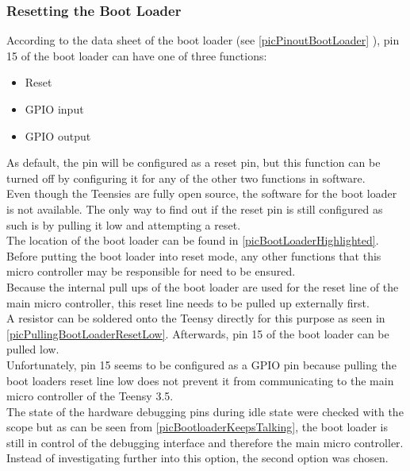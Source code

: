 \subsubsection{Resetting the Boot Loader} \label{txtResettingTheBootLoader}
According to the data sheet of the boot loader (see \autoref{picPinoutBootLoader} ), pin 15 of the boot loader can have one of three functions: \\
\begin{itemize}
    \item Reset
    \item GPIO input
    \item GPIO output
\end{itemize}
As default, the pin will be configured as a reset pin, but this function can be turned off by configuring it for any of the other two functions in software. \\
Even though the Teensies are fully open source, the software for the boot loader is not available. The only way to find out if the reset pin is still configured as such is by pulling it low and attempting a reset. \\
The location of the boot loader can be found in \autoref{picBootLoaderHighlighted}.\\
Before putting the boot loader into reset mode, any other functions that this micro controller may be responsible for need to be ensured. \\
Because the internal pull ups of the boot loader are used for the reset line of the main micro controller, this reset line needs to be pulled up externally first. \\
A resistor can be soldered onto the Teensy directly for this purpose as seen in \autoref{picPullingBootLoaderResetLow}. Afterwards, pin 15 of the boot loader can be pulled low. \\
Unfortunately, pin 15 seems to be configured as a GPIO pin because pulling the boot loaders reset line low does not prevent it from communicating to the main micro controller of the Teensy 3.5. \\
The state of the hardware debugging pins during idle state were checked with the scope but as can be seen from \autoref{picBootloaderKeepsTalking}, the boot loader is still in control of the debugging interface and therefore the main micro controller.\\
Instead of investigating further into this option, the second option was chosen. \\
%
